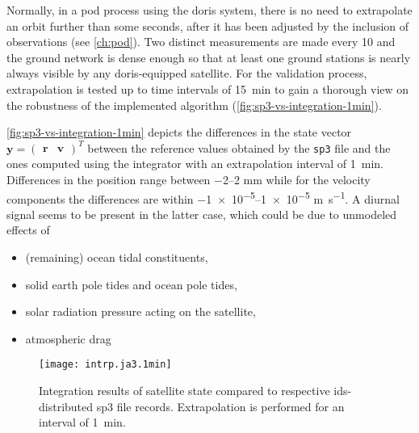 Normally, in a \gls{pod} process using the \gls{doris} system, there is no need to 
extrapolate an orbit further than some seconds, after it has been adjusted by the 
inclusion of observations (see \autoref{ch:pod}). Two distinct measurements are made 
every \SI{10}{\sec} and the ground network is dense enough so that at least one 
ground stations is nearly always visible by any \gls{doris}-equipped satellite. 
For the validation process, extrapolation is tested up to time intervals of 
\SI{15}{\minute} to gain a thorough view on the robustness of the implemented 
algorithm (\autoref{fig:sp3-vs-integration-1min}).

\autoref{fig:sp3-vs-integration-1min} depicts the differences in the state vector 
$\bm{y} = \begin{pmatrix}\bm{r} & \bm{v}\end{pmatrix}^T$ between the reference values 
obtained by the \texttt{sp3} file and the ones computed using the integrator with 
an extrapolation interval of \SI{1}{\minute}. Differences in the position range 
between \numrange{-2}{2} \si{\milli\metre} while for the velocity components the 
differences are within \numrange{-1e-5}{1e-5} \si{\metre\per\second}. A diurnal 
signal seems to be present in the latter case, which could be due to unmodeled 
effects of \begin{itemize}
  \item (remaining) ocean tidal constituents, 
  \item solid earth pole tides and ocean pole tides,
  \item solar radiation pressure acting on the satellite,
  \item atmospheric drag
\end{itemize}
\begin{figure}
  \centering
  \texttt{[image: intrp.ja3.1min]}
  \caption{Integration results of satellite state compared to respective 
    \gls{ids}-distributed sp3 file records. Extrapolation is performed for an 
    interval of \SI{1}{\minute}.}
  \label{fig:sp3-vs-integration-1min}
\end{figure}

